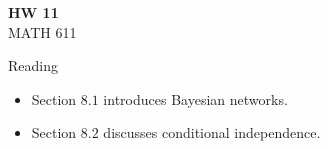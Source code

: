 \documentclass{article}
\begin{document}
\renewcommand{\a}{\textbf{a}}
\renewcommand{\b}{\textbf{b}}
\renewcommand{\d}{\textbf{d}}
\newcommand{\e}{\textbf{e}}

\large

\begin{center}
\textbf{HW 11} \\  
MATH 611
\end{center}

\medskip


\medskip


\newcommand{\normal}{\mathcal{N}}

Reading
\begin{itemize}
\item Section $8.1$ introduces Bayesian networks.
\item Section $8.2$ discusses conditional independence.  
\end{itemize}
\end{document}
